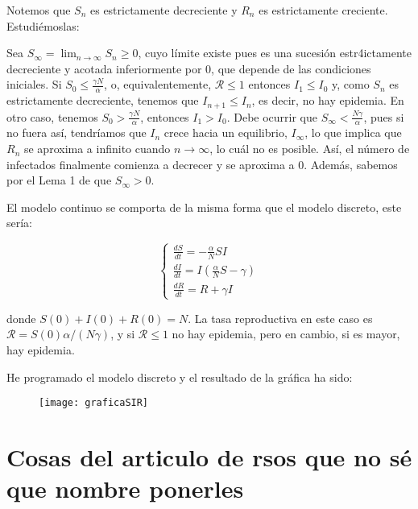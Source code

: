 Notemos que $S_n$ es estrictamente decreciente y $R_n$ es estrictamente creciente. Estudiémoslas:

Sea $S_\infty=\lim_{n\rightarrow\infty} S_n\geq 0$, cuyo límite existe pues es una sucesión estr4ictamente decreciente y acotada inferiormente por $0$, que depende de las condiciones iniciales. Si $S_0\leq \frac{\gamma N}{\alpha}$, o, equivalentemente, $\mathcal{R}\leq 1$ entonces $I_1\leq I_0$ y, como $S_n$ es estrictamente decreciente, tenemos que $I_{n+1}\leq I_n$, es decir, no hay epidemia. En otro caso, tenemos $S_0> \frac{\gamma N}{\alpha}$, entonces $I_1>I_0$. Debe ocurrir que $S_\infty <\frac{N\gamma}{\alpha}$, pues si no fuera así, tendríamos que $I_n$ crece hacia un equilibrio, $I_\infty$, lo que implica que $R_n$ se aproxima a infinito cuando $n\rightarrow\infty$, lo cuál no es posible. Así, el número de infectados finalmente comienza a decrecer y se aproxima a $0$. Además, sabemos por el Lema 1 de \cite{allenDiscretetimeSISIR1994} que $S_\infty>0$.

El modelo continuo se comporta de la misma forma que el modelo discreto, este sería:

\begin{equation}
\label{eqn: modelo_SIR_continuo}
\begin{cases}
\frac{dS}{dt} = -\frac{\alpha}{N}SI \\
\frac{dI}{dt} = I\left(\frac{\alpha}{N}S-\gamma \right) \\
\frac{dR}{dt} = R+\gamma I
\end{cases}
\end{equation}

donde $S(0)+I(0)+R(0)=N$. La tasa reproductiva en este caso es $\mathcal{R}=S(0)\alpha /(N\gamma )$, y si $\mathcal{R}\leq 1$  no hay epidemia, pero en cambio, si es mayor, hay epidemia.

He programado el modelo discreto y el resultado de la gráfica ha sido:

\begin{figure}[H]
\begin{center}
\texttt{[image: graficaSIR]}
\end{center}
\end{figure}





\section{Cosas del articulo de rsos que no sé que nombre ponerles}

